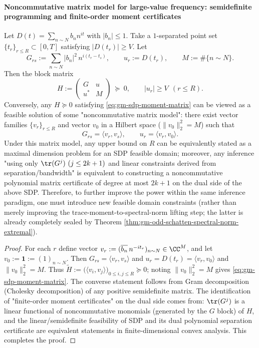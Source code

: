 \paragraph{Noncommutative matrix model for large-value frequency: semidefinite programming and finite-order moment certificates}
\begin{theorem}\label{thm:gm-large-values-sdp-moment-duality}
Let \(D(t)=\sum_{n\sim N} b_n n^{it}\) with \(|b_n|\le 1\).
Take a \(1\)-separated point set \(\{t_r\}_{r\le R}\subset[0,T]\) satisfying \(|D(t_r)|\ge V\).
Let
\[
G_{rs}:=\sum_{n\sim N} |b_n|^2\,n^{i(t_r-t_s)},\qquad
u_r:=D(t_r),\qquad
M:=\#\{n\sim N\}.
\]
Then the block matrix
\begin{equation}\label{eq:gm-sdp-moment-matrix}
H:=\begin{pmatrix}
G & u\\
u^\ast & M
\end{pmatrix}\ \succeq\ 0,
\qquad |u_r|\ge V\ \ (r\le R).
\end{equation}
Conversely, any \(H\succeq 0\) satisfying \eqref{eq:gm-sdp-moment-matrix} can be viewed as a feasible solution of some "noncommutative matrix model": there exist vector families \(\{v_r\}_{r\le R}\) and vector \(v_0\) in a Hilbert space (\(\|v_0\|_2^2=M\)) such that
\[
G_{rs}=\langle v_r,v_s\rangle,\qquad u_r=\langle v_r,v_0\rangle.
\]
Under this matrix model, any upper bound on \(R\) can be equivalently stated as a maximal dimension problem for an SDP feasible domain;
moreover, any inference "using only \(\tr(G^j)\ (j\le 2k+1)\) and linear constraints derived from separation/bandwidth"
is equivalent to constructing a noncommutative polynomial matrix certificate of degree at most \(2k+1\) on the dual side of the above SDP.
Therefore, to further improve the power within the same inference paradigm, one must introduce new feasible domain constraints (rather than merely improving the trace-moment-to-spectral-norm lifting step; the latter is already completely sealed by Theorem \ref{thm:gm-odd-schatten-spectral-norm-extremal}).
\end{theorem}

\begin{proof}
For each \(r\) define vector
\(
v_r:=(\overline{b_n}\,n^{-it_r})_{n\sim N}\in\CC^{M}
\), and let \(v_0:=\mathbf{1}:=(1)_{n\sim N}\).
Then
\(
G_{rs}=\langle v_r,v_s\rangle
\) and
\(
u_r=D(t_r)=\langle v_r,v_0\rangle
\)
and \(\|v_0\|_2^2=M\).
Thus \(\widetilde H:=\bigl(\langle v_i,v_j\rangle\bigr)_{0\le i,j\le R}\succeq 0\);
noting \(\|v_0\|_2^2=M\) gives \eqref{eq:gm-sdp-moment-matrix}.
The converse statement follows from Gram decomposition (Cholesky decomposition) of any positive semidefinite matrix.
The identification of "finite-order moment certificates" on the dual side comes from: \(\tr(G^j)\) is a linear functional of noncommutative monomials (generated by the \(G\) block) of \(H\),
and the linear/semidefinite feasibility of SDP and its dual polynomial separation certificate are equivalent statements in finite-dimensional convex analysis. This completes the proof.
\end{proof}

